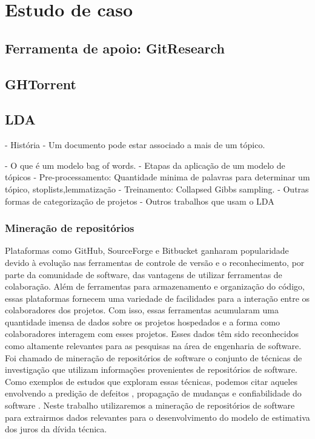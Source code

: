 \chapter{Estudo de caso}

\section{Ferramenta de apoio: GitResearch}
\label{cap_estudo_caso_ferramenta}


\section{GHTorrent}

\section{LDA}

- História
- Um documento pode estar associado a mais de um tópico.

- O que é um modelo bag of words.
- Etapas da aplicação de um modelo de tópicos
	- Pre-processamento:  Quantidade minima de palavras para determinar um tópico, stoplists,lemmatização
	- Treinamento: Collapsed  Gibbs sampling.
- Outras formas de categorização de projetos
- Outros trabalhos que usam o LDA	
 
 
 
\subsection{Mineração de repositórios}

Plataformas como GitHub, SourceForge e Bitbucket ganharam popularidade devido à evolução nas ferramentas de controle de versão e o reconhecimento, por parte da comunidade de software,  das vantagens de utilizar ferramentas de colaboração. Além de ferramentas para armazenamento e organização do código, essas plataformas fornecem uma variedade de facilidades para a interação entre os colaboradores dos projetos. Com isso, essas ferramentas acumularam uma quantidade imensa de dados sobre os projetos hospedados e a forma como colaboradores interagem com esses projetos. Esses dados têm sido reconhecidos como altamente relevantes para as pesquisas na área de engenharia de software. Foi chamado de mineração de repositórios de software \cite{bai2008mining} o conjunto de técnicas de investigação que utilizam informações provenientes de repositórios de software. Como exemplos de estudos que exploram essas técnicas, podemos citar aqueles envolvendo a predição de defeitos \cite{wang2014software}, propagação de mudanças \cite{wiese2015predicting} e confiabilidade do software \cite{de2015software}. Neste trabalho utilizaremos a mineração de repositórios de software para extrairmos dados relevantes para o desenvolvimento do modelo de estimativa dos juros da dívida técnica. 



